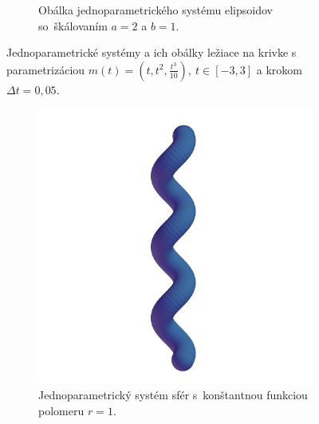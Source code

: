 \begin{figure}[h]
\begin{subfigure}[t]{0.49\textwidth}
        	\caption{Obálka jednoparametrického systému elipsoidov so~škálovaním $a=2$ a $b=1$.}
        \label{fig:plocha6}
    \end{subfigure}
    	\caption[Jednoparametrické systémy a ich obálky ležiace na krivke Bienert.]{Jednoparametrické systémy a ich obálky ležiace na krivke s parametrizáciou  $m(t)=(t, t^2, \frac{t^3}{10}), \  t \in [-3, 3]$ a krokom $\Delta t = 0,05$.}
    \label{fig:katalogI}
\end{figure}

\begin{figure}[t!]
	\captionsetup{justification=centering}
	\captionsetup[subfigure]{justification=centering}
    \begin{subfigure}[t]{0.32\textwidth}
        \centering
        \includegraphics[width=\textwidth]{images/helix_spheres.png}
		\caption{Jednoparametrický systém sfér s~konštantnou funkciou polomeru $r=1.$}
        \label{fig:plocha7}
    \end{subfigure}
    \hfill
    \begin{subfigure}[t]{0.32\textwidth}
        \centering

\end{subfigure}
\end{figure}
